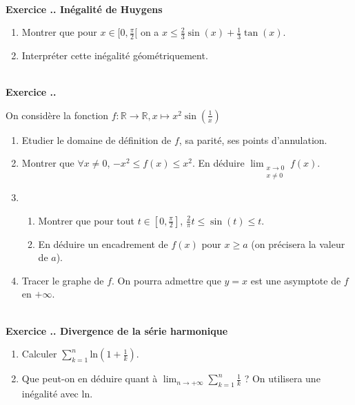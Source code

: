 \documentclass{article}
\newcommand{\mb}[1]{\mathbb{#1}}
\newcounter{exo}
\newcommand{\exercice}[1][\null]{\textbf{\\ Exercice \thesection.\theexo. #1} \addtocounter{exo}{1}}
\begin{document}
\exercice[Inégalité de Huygens]

\begin{enumerate}

\item Montrer que pour $x \in [0, \frac{\pi}{2}[$ on a $x \le \frac{2}{3} \sin(x) + \frac{1}{3} \tan(x) $.

\item Interpréter cette inégalité géométriquement.

\end{enumerate}


\exercice

On considère la fonction $f : \mb{R} \rightarrow \mb{R}, x \mapsto x^2 \sin(\frac{1}{x})$

\begin{enumerate}

\item Etudier le domaine de définition de $f$, sa parité, ses points d'annulation.

\item Montrer que $\forall x \neq 0$, $-x^2 \le f(x) \le x^2$. En déduire $\displaystyle \lim_{\substack{x \rightarrow 0\\x \neq 0}} f(x)$.

\item \begin{enumerate}

\item Montrer que pour tout $t\in [0,\frac{\pi}{2}]$, $\frac{2}{\pi}t \le \sin(t) \le t$.

\item En déduire un encadrement de $f(x)$ pour $x \ge a$ (on précisera la valeur de $a$).

\end{enumerate}

\item Tracer le graphe de $f$. On pourra admettre que $y =x$ est une asymptote de $f$ en $+ \infty$.
\end{enumerate}





\exercice[Divergence de la série harmonique]

\begin{enumerate}

\item Calculer $\displaystyle \sum_{k=1}^n  \text{ln}(1+ \frac{1}{k})$.

\item Que peut-on en déduire quant à $\displaystyle \lim_{n \to + \infty} \sum_{k=1}^n \frac{1}{k}$ ? On utilisera une inégalité avec $\text{ln}$.
\end{enumerate}
\end{document}
